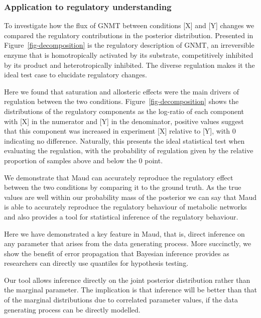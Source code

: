 \documentclass[
  letterpaper,
  DIV=11,
  numbers=noendperiod]{scrartcl}
\begin{document}
\hypertarget{application-to-regulatory-understanding}{%
\subsubsection{Application to regulatory
understanding}\label{application-to-regulatory-understanding}}

To investigate how the flux of GNMT between conditions {[}X{]} and
{[}Y{]} changes we compared the regulatory contributions in the
posterior distribution. Presented in Figure~\ref{fig-decomposition} is
the regulatory description of GNMT, an irreversible enzyme that is
homotropically activated by its substrate, competitively inhibited by
its product and heterotropically inhibited. The diverse regulation makes
it the ideal test case to elucidate regulatory changes.

Here we found that saturation and allosteric effects were the main
drivers of regulation between the two conditions.
Figure~\ref{fig-decomposition} shows the distributions of the regulatory
components as the log-ratio of each component with {[}X{]} in the
numerator and {[}Y{]} in the denominator, positive values suggest that
this component was increased in experiment {[}X{]} relative to {[}Y{]},
with 0 indicating no difference. Naturally, this presents the ideal
statistical test when evaluating the regulation, with the probability of
regulation given by the relative proportion of samples above and below
the 0 point.

We demonstrate that Maud can accurately reproduce the regulatory effect
between the two conditions by comparing it to the ground truth. As the
true values are well within our probability mass of the posterior we can
say that Maud is able to accurately reproduce the regulatory behaviour
of metabolic networks and also provides a tool for statistical inference
of the regulatory behaviour.

Here we have demonstrated a key feature in Maud, that is, direct
inference on any parameter that arises from the data generating process.
More succinctly, we show the benefit of error propagation that Bayesian
inference provides as researchers can directly use quantiles for
hypothesis testing.

Our tool allows inference directly on the joint posterior distribution
rather than the marginal parameter. The implication is that inference
will be better than that of the marginal distributions due to correlated
parameter values, if the data generating process can be directly
modelled.
\end{document}
